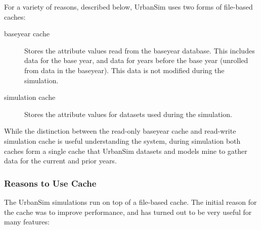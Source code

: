 For a variety of reasons, described below, UrbanSim uses two forms of file-based
caches:
\begin{description}
\item[baseyear cache] \baseyearcacheindex
Stores the attribute values read from the baseyear
database.  This includes data for the base year, and data for years before the
base year (unrolled from data in the baseyear).  This data is not modified
during the simulation.

\item[simulation cache] \simulationcacheindex
Stores the attribute values for datasets used during the simulation.
\end{description}
While the distinction between the read-only baseyear cache \baseyearcacheindex and read-write
simulation cache \simulationcacheindex is useful understanding the system, during simulation both
caches form a single cache that UrbanSim datasets \datasetindex and models \modelsindex mine to gather data
for the current and prior years.

\subsubsection{Reasons to Use Cache}
The UrbanSim simulations run on top of a file-based cache.  The initial reason
for the cache was to improve performance, and has turned out to be very useful for
many features:

